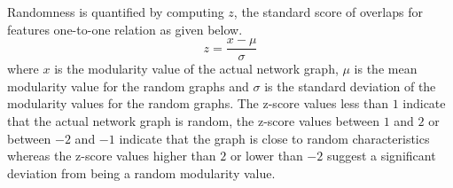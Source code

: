 Randomness is quantified by computing $z$, the standard score of overlaps for features one-to-one relation as given below.
\begin{equation} %
	z = \frac{x-\mu}{\sigma}
	\label{zscore}
\end{equation}
where $x$ is the modularity value of the actual network graph, $\mu$ is the mean modularity value for the random graphs and $\sigma$ is the standard deviation of the modularity values for the random graphs. The z-score values less than $1$ indicate that the actual network graph is random, the z-score values between $1$ and $2$ or between $-2$ and $-1$ indicate that the graph is close to random characteristics whereas the z-score values higher than $2$ or lower than $-2$ suggest a significant deviation from being a random modularity value. 

~\cite{normaldistribution}



